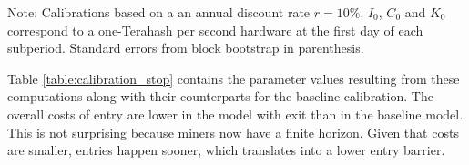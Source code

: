 \documentclass[12pt, a4paper]{article}
\begin{document}
\begin{table}[h]
\caption{Calibration with and without Exit}
\label{table:calibration_stop}
\begin{center}
\end{center}
\footnotesize{Note: Calibrations based on a an annual discount rate $r=10\%$.
$I_0$, $C_0$ and $K_0$ correspond to a one-Terahash per second hardware at the first day of each subperiod.
Standard errors from block bootstrap in parenthesis.}
\end{table}


Table \ref{table:calibration_stop} contains the parameter values resulting
from these computations along with their counterparts for the baseline
calibration. The overall costs of entry are lower in the model with exit
than in the baseline model. This is not surprising because miners now have a
finite horizon. Given that costs are smaller, entries happen sooner, which
translates into a lower entry barrier.
\end{document}
